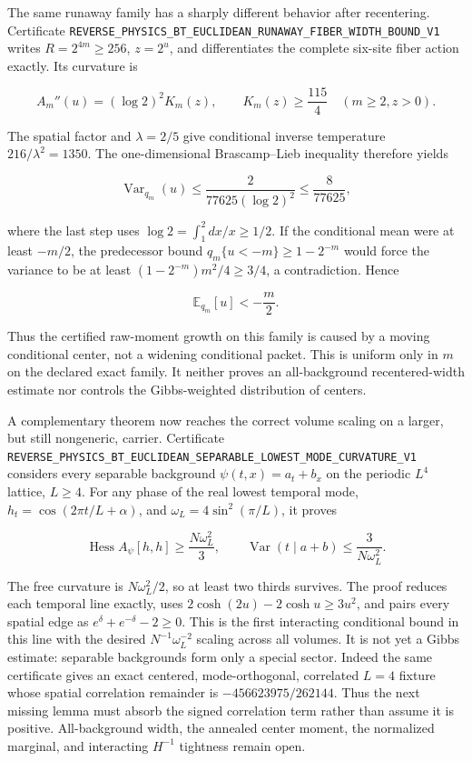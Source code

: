 \documentclass[11pt]{article}
\theoremstyle{definition}
\theoremstyle{remark}
\newcommand{\cert}[1]{\nolinkurl{#1}}
\begin{document}
The same runaway family has a sharply different behavior after recentering.
Certificate
\cert{REVERSE_PHYSICS_BT_EUCLIDEAN_RUNAWAY_FIBER_WIDTH_BOUND_V1}
writes $R=2^{4m}\geq256$, $z=2^u$, and differentiates the complete
six-site fiber action exactly.  Its curvature is

\[
 A_m''(u)=(\log2)^2K_m(z),\qquad K_m(z)\geq\frac{115}{4}
 \quad(m\geq2, z>0).
\]

The spatial factor and $\lambda=2/5$ give conditional inverse temperature
$216/\lambda^2=1350$.  The one-dimensional Brascamp--Lieb inequality
therefore yields

\[
 \operatorname{Var}_{q_m}(u)
 \leq\frac{2}{77625(\log2)^2}
 \leq\frac{8}{77625},
\]

where the last step uses
$\log2=\int_1^2dx/x\geq1/2$.  If the conditional mean were at least
$-m/2$, the predecessor bound $q_m\{u<-m\}\geq1-2^{-m}$ would force the
variance to be at least $(1-2^{-m})m^2/4\geq3/4$, a contradiction.  Hence

\[
                         \mathbb E_{q_m}[u]<-\frac m2.
\]

Thus the certified raw-moment growth on this family is caused by a moving
conditional center, not a widening conditional packet.  This is uniform only
in $m$ on the declared exact family.  It neither proves an all-background
recentered-width estimate nor controls the Gibbs-weighted distribution of
centers.

A complementary theorem now reaches the correct volume scaling on a larger,
but still nongeneric, carrier.  Certificate
\cert{REVERSE_PHYSICS_BT_EUCLIDEAN_SEPARABLE_LOWEST_MODE_CURVATURE_V1}
considers every separable background $\psi(t,x)=a_t+b_x$ on the periodic
$L^4$ lattice, $L\geq4$.  For any phase of the real lowest temporal mode,
$h_t=\cos(2\pi t/L+\alpha)$, and
$\omega_L=4\sin^2(\pi/L)$, it proves

\[
 \operatorname{Hess}A_\psi[h,h]\geq\frac{N\omega_L^2}{3},
 \qquad
 \operatorname{Var}(t\mid a+b)\leq\frac{3}{N\omega_L^2}.
\]

The free curvature is $N\omega_L^2/2$, so at least two thirds survives.
The proof reduces each temporal line exactly, uses
$2\cosh(2u)-2\cosh u\geq3u^2$, and pairs every spatial edge as
$e^\delta+e^{-\delta}-2\geq0$.  This is the first interacting conditional
bound in this line with the desired $N^{-1}\omega_L^{-2}$ scaling across all
volumes.  It is not yet a Gibbs estimate: separable backgrounds form only a
special sector.  Indeed the same certificate gives an exact centered,
mode-orthogonal, correlated $L=4$ fixture whose spatial correlation remainder
is $-456623975/262144$.  Thus the next missing lemma must absorb the signed
correlation term rather than assume it is positive.  All-background width,
the annealed center moment, the normalized marginal, and interacting
$H^{-1}$ tightness remain open.
\end{document}
